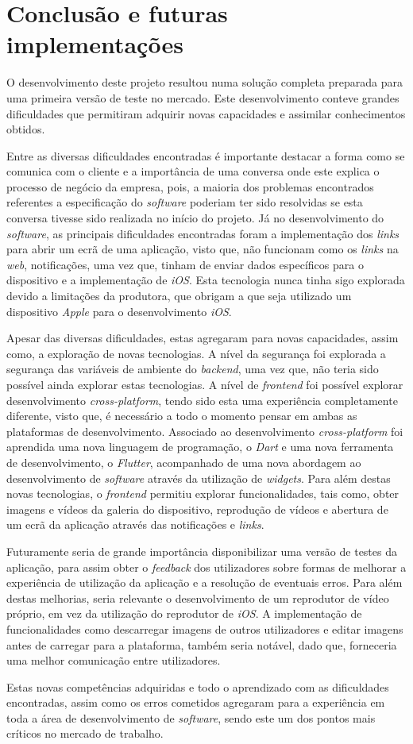 \chapter{Conclusão e futuras implementações}

O desenvolvimento deste projeto resultou numa solução completa preparada para uma primeira versão de teste no mercado. Este desenvolvimento conteve grandes dificuldades que permitiram adquirir novas capacidades e assimilar conhecimentos obtidos.

Entre as diversas dificuldades encontradas é importante destacar a forma como se comunica com o cliente e a importância de uma conversa onde este explica o processo de negócio da empresa, pois, a maioria dos problemas encontrados referentes a especificação do \textit{software} poderiam ter sido resolvidas se esta conversa tivesse sido realizada no início do projeto. Já no desenvolvimento do \textit{software}, as principais dificuldades encontradas foram a implementação dos \textit{links} para abrir um ecrã de uma aplicação, visto que, não funcionam como os \textit{links} na \textit{web}, notificações, uma vez que, tinham de enviar dados específicos para o dispositivo e a implementação de \textit{iOS}. Esta tecnologia nunca tinha sigo explorada devido a limitações da produtora, que obrigam a que seja utilizado um dispositivo \textit{Apple} para o desenvolvimento \textit{iOS}.

Apesar das diversas dificuldades, estas agregaram para novas capacidades, assim como, a exploração de novas tecnologias. A nível da segurança foi explorada a segurança das variáveis de ambiente do \textit{backend}, uma vez que, não teria sido possível ainda explorar estas tecnologias. A nível de \textit{frontend} foi possível explorar desenvolvimento \textit{cross-platform}, tendo sido esta uma experiência completamente diferente, visto que, é necessário a todo o momento pensar em ambas as plataformas de desenvolvimento. Associado ao desenvolvimento \textit{cross-platform} foi aprendida uma nova linguagem de programação, o \textit{Dart} e uma nova ferramenta de desenvolvimento, o \textit{Flutter}, acompanhado de uma nova abordagem ao desenvolvimento de \textit{software} através da utilização de \textit{widgets}. Para além destas novas tecnologias, o \textit{frontend} permitiu explorar funcionalidades, tais como, obter imagens e vídeos da galeria do dispositivo, reprodução de vídeos e abertura de um ecrã da aplicação através das notificações e \textit{links}.

Futuramente seria de grande importância disponibilizar uma versão de testes da aplicação, para assim obter o \emph{feedback} dos utilizadores sobre formas de melhorar a experiência de utilização da aplicação e a resolução de eventuais erros. Para além destas melhorias, seria relevante o desenvolvimento de um reprodutor de vídeo próprio, em vez da utilização do reprodutor de \emph{iOS}. A implementação de funcionalidades como descarregar imagens de outros utilizadores e editar imagens antes de carregar para a plataforma, também seria notável, dado que, forneceria uma melhor comunicação entre utilizadores. 

Estas novas competências adquiridas e todo o aprendizado com as dificuldades encontradas, assim como os erros cometidos agregaram para a experiência em toda a área de desenvolvimento de \emph{software}, sendo este um dos pontos mais críticos no mercado de trabalho.


